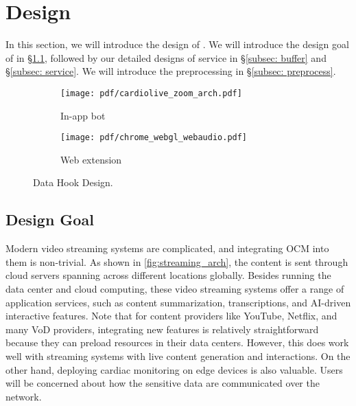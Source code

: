 \section{\sysname Design}
\label{sec: sys_design}

In this section, we will introduce the design of \sysname. We will introduce the design goal of \sysname in \S\ref{subsec: design_goal}, followed by our detailed designs of service in \S\ref{subsec: buffer} and \S\ref{subsec: service}. We will introduce the preprocessing in \S\ref{subsec: preprocess}.

\begin{figure}[t]
    \centering
    \begin{minipage}{0.8\linewidth}
    \begin{subfigure}{.48\linewidth}
            \texttt{[image: pdf/cardiolive\_zoom\_arch.pdf]}
        \caption{In-app bot}
        \label{fig:zoom_arch}
        \end{subfigure}\hfill
        \begin{subfigure}{.48\linewidth}
            \texttt{[image: pdf/chrome\_webgl\_webaudio.pdf]} %
            \caption{Web extension}
            \label{subfig:chrome_av}
        \end{subfigure}
    \caption{Data Hook Design.}
    \label{fig:data_hook}
    \end{minipage}
\end{figure}

\subsection{Design Goal}
\label{subsec: design_goal}
Modern video streaming systems are complicated, and integrating OCM into them is non-trivial. 
As shown in \fig\ref{fig:streaming_arch}, the content is sent through cloud servers spanning across different locations globally. 
Besides running the data center and cloud computing, these video streaming systems offer a range of application services, such as content summarization, transcriptions, and AI-driven interactive features. 
Note that for content providers like YouTube, Netflix, and many VoD providers, integrating new features is relatively straightforward because they can preload resources in their data centers.  However, this does work well with streaming systems with live content generation and interactions.
On the other hand, deploying cardiac monitoring on edge devices is also valuable. Users will be concerned about how the sensitive data are communicated over the network. 

